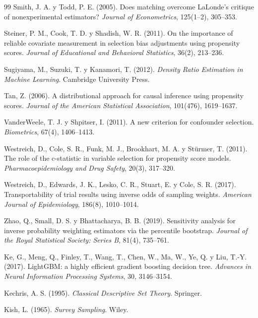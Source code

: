 \begin{thebibliography}{99}
 Smith, J. A. y Todd, P. E. (2005). Does matching overcome LaLonde's critique of nonexperimental estimators? \emph{Journal of Econometrics}, 125(1--2), 305--353.

 Steiner, P. M., Cook, T. D. y Shadish, W. R. (2011). On the importance of reliable covariate measurement in selection bias adjustments using propensity scores. \emph{Journal of Educational and Behavioral Statistics}, 36(2), 213--236.

 Sugiyama, M., Suzuki, T. y Kanamori, T. (2012). \emph{Density Ratio Estimation in Machine Learning}. Cambridge University Press.

 Tan, Z. (2006). A distributional approach for causal inference using propensity scores. \emph{Journal of the American Statistical Association}, 101(476), 1619--1637.

 VanderWeele, T. J. y Shpitser, I. (2011). A new criterion for confounder selection. \emph{Biometrics}, 67(4), 1406--1413.

 Westreich, D., Cole, S. R., Funk, M. J., Brookhart, M. A. y Stürmer, T. (2011). The role of the c-statistic in variable selection for propensity score models. \emph{Pharmacoepidemiology and Drug Safety}, 20(3), 317--320.

 Westreich, D., Edwards, J. K., Lesko, C. R., Stuart, E. y Cole, S. R. (2017). Transportability of trial results using inverse odds of sampling weights. \emph{American Journal of Epidemiology}, 186(8), 1010--1014.

 Zhao, Q., Small, D. S. y Bhattacharya, B. B. (2019). Sensitivity analysis for inverse probability weighting estimators via the percentile bootstrap. \emph{Journal of the Royal Statistical Society: Series B}, 81(4), 735--761.

 Ke, G., Meng, Q., Finley, T., Wang, T., Chen, W., Ma, W., Ye, Q. y Liu, T.-Y. (2017). LightGBM: a highly efficient gradient boosting decision tree. \emph{Advances in Neural Information Processing Systems}, 30, 3146--3154.

 Kechris, A. S. (1995). \emph{Classical Descriptive Set Theory}. Springer.

 Kish, L. (1965). \emph{Survey Sampling}. Wiley.


\end{thebibliography}

